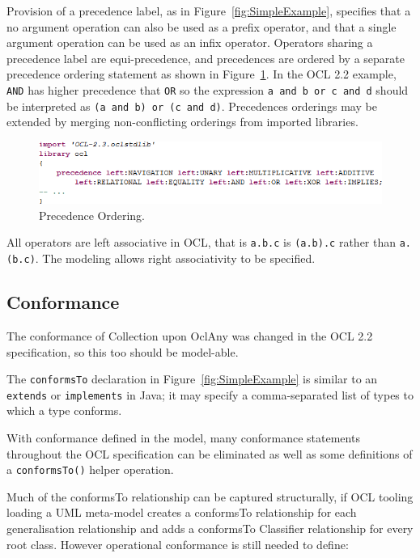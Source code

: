 \documentclass{eceasst}
\begin{document}
Provision of a precedence label, as in Figure~\ref{fig:SimpleExample}, specifies that a no argument operation can also be used as a prefix operator, and that a single argument operation can be used as an infix operator. Operators sharing a precedence label are equi-precedence, and precedences are ordered by a separate precedence ordering statement as shown in Figure~\ref{fig:Precedence}. In the OCL 2.2 example, \verb|AND| has higher precedence that \verb|OR| so the expression \verb|a and b or c and d| should be interpreted as \verb|(a and b) or (c and d)|. Precedences orderings may be extended by merging non-conflicting orderings from imported libraries.

\begin{figure}
  \begin{center}
    \includegraphics[width=5.75in]{Precedence.png}
  \end{center}
  \caption{Precedence Ordering.}
  \label{fig:Precedence}
\end{figure}

All operators are left associative in OCL, that is \verb|a.b.c| is \verb|(a.b).c| rather than \verb|a.(b.c)|. The modeling allows right associativity to be specified.

\subsection{Conformance}

The conformance of Collection upon OclAny was changed in the OCL 2.2 specification, so this too should be model-able.

The \verb|conformsTo| declaration in Figure~\ref{fig:SimpleExample} is similar to an \verb|extends| or \verb|implements| in Java; it may specify a comma-separated list of types to which a type conforms.

With conformance defined in the model, many conformance statements throughout the OCL specification can be eliminated as well as some definitions of a \verb|conformsTo()| helper operation.

Much of the conformsTo relationship can be captured structurally, if OCL tooling loading a UML meta-model creates a conformsTo relationship for each generalisation relationship and adds a conformsTo Classifier relationship for every root class. However operational conformance is still needed to define:
\end{document}
